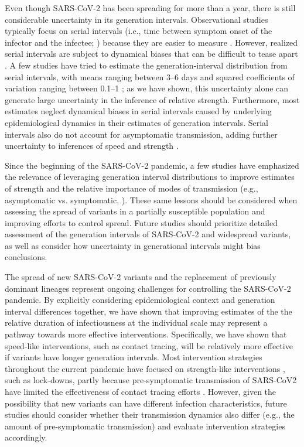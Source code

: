 \documentclass[12pt]{article}
\begin{document}
Even though SARS-CoV-2 has been spreading for more than a year, there is still considerable uncertainty in its generation intervals.
Observational studies typically focus on serial intervals (i.e., time between symptom onset of the infector and the infectee; \cite{svensson2007note}) because they are easier to measure \citep{griffin2020rapid}.
However, realized serial intervals are subject to dynamical biases that can be difficult to tease apart \citep{park2021forward}.
A few studies have tried to estimate the generation-interval distribution from serial intervals, with means ranging between 3--6 days and squared coefficients of variation ranging between 0.1--1 \citep{ferretti2020quantifying,Ferretti2020timing,ganyani2020estimating,knight2020estimating}; 
as we have shown, this uncertainty alone can generate large uncertainty in the inference of relative strength.
Furthermore, most estimates neglect dynamical biases in serial intervals caused by underlying epidemiological dynamics in their estimates of generation intervals.
Serial intervals also do not account for asymptomatic transmission, adding further uncertainty to inferences of speed and strength \citep{park2020time}.

Since the beginning of the SARS-CoV-2 pandemic, a few studies have emphasized the relevance of leveraging generation interval distributions to improve estimates of strength \citep{doi:10.1098/rsif.2020.0144,ali2020serial,gostic2020practical,park2021forward} and the relative importance of modes of transmission (e.g., asymptomatic vs. symptomatic, \cite{park2020time}).
These same lessons should be considered when assessing the spread of variants in a partially susceptible population and improving efforts to control spread.
Future studies should prioritize detailed assessment of the generation intervals of SARS-CoV-2 and widespread variants, as well as consider how uncertainty in generational intervals might bias conclusions.

The spread of new SARS-CoV-2 variants and the replacement of previously dominant lineages represent ongoing challenges for controlling the SARS-CoV-2 pandemic.  
By explicitly considering epidemiological context and generation interval differences together, we have shown that improving estimates of the the relative duration of infectiousness at the individual scale may represent a pathway towards more effective interventions. 
Specifically, we have shown that speed-like interventions, such as contact tracing, will be relatively more effective if variants have longer generation intervals.
Most intervention strategies throughout the current pandemic have focused on strength-like interventions \citep{flaxman2020Rt}, such as lock-downs, partly because pre-symptomatic transmission of SARS-CoV2 have limited the effectiveness of contact tracing efforts \citep{hellewell2020feasibility}.
However, given the possibility that new variants can have different infection characteristics, future studies should consider whether their transmission dynamics also differ (e.g., the amount of pre-symptomatic transmission) and evaluate intervention strategies accordingly.
\end{document}

